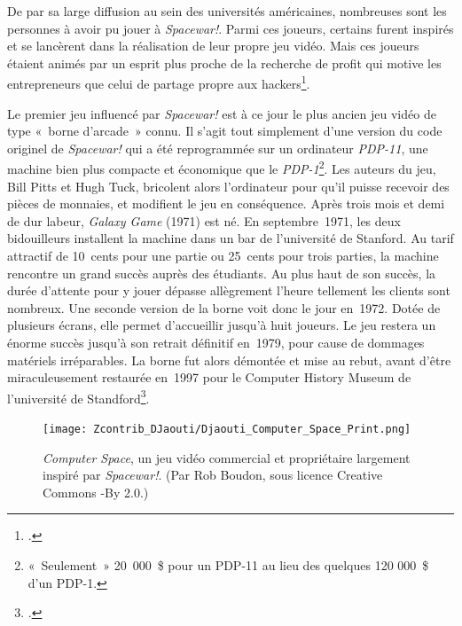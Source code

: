 \documentclass{FramateX}
\begin{document}
\begin{refsection}
De par sa large diffusion au sein des universités américaines,
nombreuses sont les personnes à avoir pu jouer à
\textit{Spacewar!}. Parmi ces joueurs,
certains furent inspirés et se lancèrent dans la réalisation de leur
propre jeu vidéo. Mais ces joueurs étaient animés par un esprit plus
proche de la recherche de profit qui motive les entrepreneurs que celui
de partage propre aux hackers\footnote{\cite{bartonhistory2009}.}.


Le premier jeu influencé par  \textit{Spacewar!} est à ce jour le plus ancien jeu vidéo de type «~borne d'arcade~» connu. Il s'agit tout simplement d'une version du code originel de \textit{Spacewar!} qui a été reprogrammée sur
un ordinateur \textit{PDP-11}, une machine
bien plus compacte et économique que le
\textit{PDP-1}\footnote{«~Seulement~»
20~000~\$ pour un PDP-11 au lieu des quelques 120 000~\$ d'un PDP-1.}.
Les auteurs du jeu, Bill Pitts et Hugh Tuck, bricolent alors
l'ordinateur pour qu'il puisse recevoir des pièces de monnaies, et
modifient le jeu en conséquence. Après trois mois et demi de dur
labeur, \textit{Galaxy Game} (1971) est né.
En septembre~1971, les deux bidouilleurs installent la machine dans un
bar de l'université de Stanford. Au tarif attractif de 10~cents pour
une partie ou 25~cents pour trois parties, la machine rencontre un
grand succès auprès des étudiants. Au plus haut de son succès, la durée
d'attente pour y jouer dépasse allègrement l'heure tellement les
clients sont nombreux. Une seconde version de la borne voit donc le
jour en~1972. Dotée de plusieurs écrans, elle permet d'accueillir
jusqu'à huit joueurs. Le jeu restera un énorme succès jusqu'à son
retrait définitif en~1979, pour cause de dommages matériels
irréparables. La borne fut alors démontée et mise au rebut, avant
d'être miraculeusement restaurée en~1997 pour le Computer History
Museum de l'université de Standford\footnote{\cite{pittsgalaxy1997}.}.


\begin{figure}
\centering
\texttt{[image: Zcontrib\_DJaouti/Djaouti\_Computer\_Space\_Print.png]}
\caption{\textit{Computer Space}, un jeu vidéo commercial et propriétaire largement inspiré par \textit{Spacewar!}. (Par Rob Boudon, sous licence Creative Commons -By 2.0.)}
\end{figure}


\end{refsection}
\end{document}
